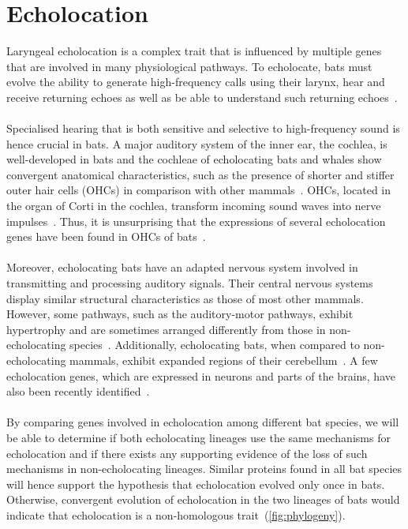 \documentclass[11pt]{article}
\begin{document}
\section{Echolocation}

Laryngeal echolocation is a complex trait that is influenced by multiple genes that are involved in many physiological pathways. To echolocate, bats must evolve the ability to generate high-frequency calls using their larynx, hear and receive returning echoes as well as be able to understand such returning echoes~\citep{Teeling2009}. 
\\
\\
Specialised hearing that is both sensitive and selective to high-frequency sound is hence crucial in bats. A major auditory system of the inner ear, the cochlea, is well-developed in bats and the cochleae of echolocating bats and whales show convergent anatomical characteristics, such as the presence of shorter and stiffer outer hair cells (OHCs) in comparison with other mammals~\citep{Liu2010}. OHCs, located in the organ of Corti in the cochlea, transform incoming sound waves into nerve impulses~\citep{Robles}. Thus, it is unsurprising that the expressions of several echolocation genes have been found in OHCs of bats~\citep{Davies2012, Li2008a, Liu2012}.
\\
\\
Moreover, echolocating bats have an adapted nervous system involved in transmitting and processing auditory signals. Their central nervous systems display similar structural characteristics as those of most other mammals. However, some pathways, such as the auditory-motor pathways, exhibit hypertrophy and are sometimes arranged differently from those in non-echolocating species~\citep{Covey2005}. Additionally, echolocating bats, when compared to non-echolocating mammals, exhibit expanded regions of their cerebellum~\citep{Paulin1993a}. A few echolocation genes, which are expressed in neurons and parts of the brains, have also been recently identified~\citep{Davies2012, Li2007a}.
\\
\\
By comparing genes involved in echolocation among different bat species, we will be able to determine if both echolocating lineages use the same mechanisms for echolocation and if there exists any supporting evidence of the loss of such mechanisms in non-echolocating lineages. Similar proteins found in all bat species will hence support the hypothesis that echolocation evolved only once in bats. Otherwise, convergent evolution of echolocation in the two lineages of bats would indicate that echolocation is a non-homologous trait~\citep{Teeling2009}(\autoref{fig:phylogeny}).
\end{document}
